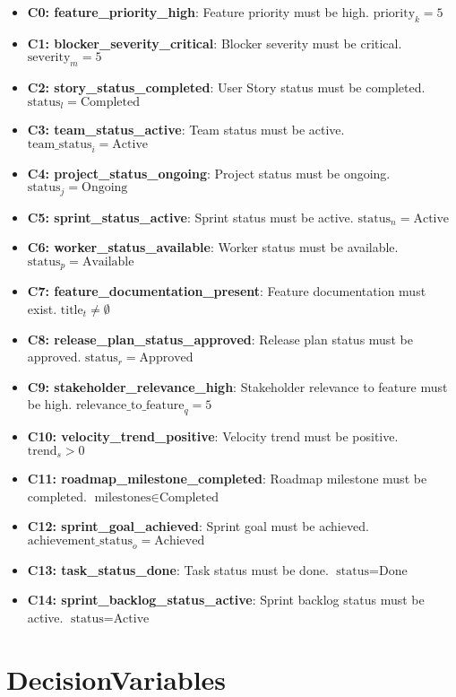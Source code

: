 \documentclass{article}
\begin{document}
\begin{itemize}
    \item \textbf{C0: feature\_priority\_high}: Feature priority must be high.  $\text{priority}_k = 5$
    \item \textbf{C1: blocker\_severity\_critical}: Blocker severity must be critical.  $\text{severity}_m = 5$
    \item \textbf{C2: story\_status\_completed}: User Story status must be completed. $\text{status}_l = \text{Completed}$
    \item \textbf{C3: team\_status\_active}: Team status must be active. $\text{team\_status}_i = \text{Active}$
    \item \textbf{C4: project\_status\_ongoing}: Project status must be ongoing. $\text{status}_j = \text{Ongoing}$
    \item \textbf{C5: sprint\_status\_active}: Sprint status must be active. $\text{status}_n = \text{Active}$
    \item \textbf{C6: worker\_status\_available}: Worker status must be available. $\text{status}_p = \text{Available}$
    \item \textbf{C7: feature\_documentation\_present}: Feature documentation must exist. $\text{title}_t \neq \emptyset$
    \item \textbf{C8: release\_plan\_status\_approved}: Release plan status must be approved. $\text{status}_r = \text{Approved}$
    \item \textbf{C9: stakeholder\_relevance\_high}: Stakeholder relevance to feature must be high. $\text{relevance\_to\_feature}_q = 5$
    \item \textbf{C10: velocity\_trend\_positive}: Velocity trend must be positive. $\text{trend}_s > 0$
    \item \textbf{C11: roadmap\_milestone\_completed}: Roadmap milestone must be completed. $\text{milestones} \in \text{Completed}$
    \item \textbf{C12: sprint\_goal\_achieved}: Sprint goal must be achieved. $\text{achievement\_status}_o = \text{Achieved}$
    \item \textbf{C13: task\_status\_done}: Task status must be done. $\text{status} = \text{Done}$
    \item \textbf{C14: sprint\_backlog\_status\_active}: Sprint backlog status must be active. $\text{status} = \text{Active}$
\end{itemize}

\section{DecisionVariables}
\end{document}
